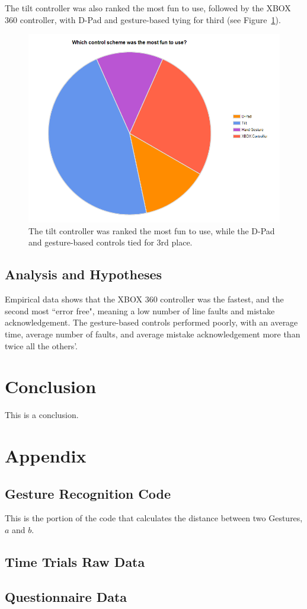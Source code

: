 \documentclass[12pt,a4paper]{report}
\begin{document}
The tilt controller was also ranked the most fun to use, followed by the XBOX 360 controller, with D-Pad and gesture-based tying for third (see Figure~\ref{sm_53}).

\begin{figure}[h!]
	\centering
	\includegraphics[width=5in]{images/sm_53.png}
	\caption{The tilt controller was ranked the most fun to use, while the D-Pad and gesture-based controls tied for 3rd place.}
	\label{sm_53}
\end{figure}

\section{Analysis and Hypotheses}
Empirical data shows that the XBOX 360 controller was the fastest, and the second most ``error free", meaning a low number of line faults and mistake acknowledgement. The gesture-based controls performed poorly, with an average time, average number of faults, and average mistake acknowledgement more than twice all the others'.

\chapter{Conclusion}
This is a conclusion.




\clearpage
\pagestyle{plain}
\chapter*{Appendix}
\section*{Gesture Recognition Code}
This is the portion of the code that calculates the distance between two Gestures, $a$ and $b$.
\lstset{language=Java, breaklines=true, tabsize=2}


\section*{Time Trials Raw Data}

\section*{Questionnaire Data}

\end{document}
